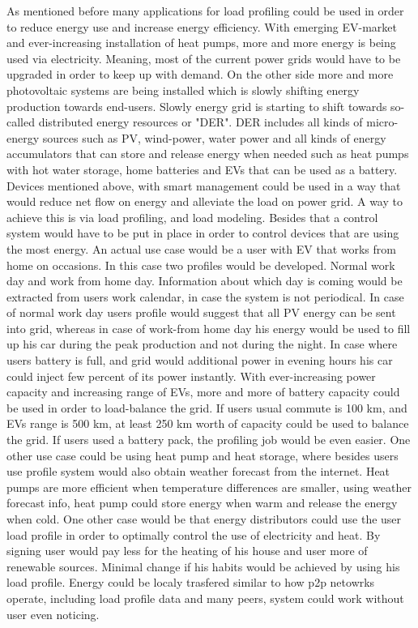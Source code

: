 \documentclass[
11pt, %
english, %
singlespacing, %
headsepline, %
]{MastersDoctoralThesis} %
\begin{document}
As mentioned before many applications for load profiling could be used in order to reduce energy use 
and increase energy efficiency. With emerging EV-market and ever-increasing installation of heat pumps,
more and more energy is being used via electricity. Meaning, most of the current power grids would have to 
be upgraded in order to keep up with demand. On the other side more and more photovoltaic systems
are being installed which is slowly shifting energy production towards end-users. Slowly energy grid
is starting to shift towards so-called distributed energy resources or "DER". DER includes all kinds of 
micro-energy sources such as PV, wind-power, water power and all kinds of energy accumulators that can store 
and release energy when needed such as heat pumps with hot water storage, home batteries and EVs that can be 
used as a battery. Devices mentioned above, with smart management could be used in a way that would
reduce net flow on energy and alleviate the load on power grid. A way to achieve this is via load profiling,
and load modeling. Besides that a control system would have to be put in place in order to control devices 
that are using the most energy. An actual use case would be a user with EV that works from home on occasions. 
In this case two profiles would be developed. Normal work day and work from home day. Information about
which day is coming would be extracted from users work calendar, in case the system is not periodical. 
In case of normal work day users profile would suggest that all PV energy can be sent into grid, whereas 
in case of work-from home day his energy would be used to fill up his car during the peak production and not during the night.
In case where users battery is full, and grid would additional power in evening hours his car could inject few percent
of its power instantly. With ever-increasing power capacity and increasing range of EVs, more and more of battery capacity could 
be used in order to load-balance the grid. If users usual commute is 100 km, and EVs range is 500 km, at least 250 km worth of capacity could
be used to balance the grid. If users used a battery pack, the profiling job would be even easier. 
One other use case could be using heat pump and heat storage, where besides users use profile system would also obtain weather forecast from the internet.
Heat pumps are more efficient when temperature differences are smaller, using weather forecast info, heat pump could store energy when warm and release the energy when cold.
One other case would be that energy distributors could use the user load profile in order to optimally control the use of electricity and heat. 
By signing user would pay less for the heating of his house and user more of renewable sources. Minimal change if his habits would be achieved by using his load profile.
Energy could be localy trasfered similar to how p2p netowrks operate, including load profile data and many peers, system could work without user even noticing.
\end{document}

